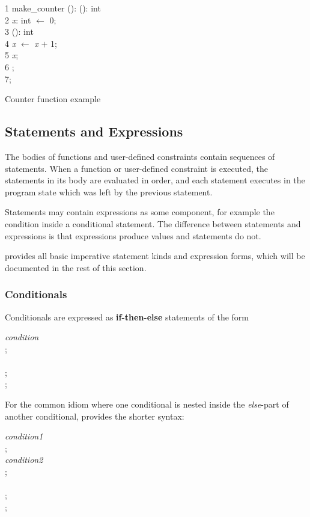 \begin{Program}
\begin{ttlprog}
1\>\ttlFun{} make\_counter (): \ttlFun{} (): int\\
2\>\>\ttlVar{} {\em x}: int $\leftarrow$ 0;\\
3\>\>\ttlReturn{} \ttlFun{} (): int\\
4\>\>\>\>\>\> {\em x} $\leftarrow$ {\em x} $+$ 1;\\
5\>\>\>\>\>\> \ttlReturn{} {\em x};\\
6\>\>\>\>\> \ttlEnd{};\\
7\>\ttlEnd{};
\end{ttlprog}
\caption{Counter function example}
\label{prog:counter}
\end{Program}

\subsection{Statements and Expressions}

The bodies of functions and user-defined constraints contain sequences
of statements.  When a function or user-defined constraint is
executed, the statements in its body are evaluated in order, and each
statement executes in the program state which was left by the previous
statement.

Statements may contain expressions as some component, for example the
condition inside a conditional statement.  The difference between
statements and expressions is that expressions produce values and
statements do not.

\turtle{} provides all basic imperative statement kinds
and expression forms, which will be documented in the rest of this
section.

\subsubsection{Conditionals}

Conditionals are expressed as {\bf if-then-else} statements of the
form
%
\begin{ttlprog}
\>\ttlIf{} {\em condition} \ttlThen{}\\
\>;\\
\>\ttlElse{}\\
\>;\\
\>\ttlEnd{};
\end{ttlprog}
%
For the common idiom where one conditional is nested inside the {\em
  else}-part of another conditional, \turtle{} provides the shorter
syntax:
%
\begin{ttlprog}
\>\ttlIf{} {\em condition1} \ttlThen{}\\
\>;\\
\>\ttlElsif{} {\em condition2} \ttlThen{}\\
\>;\\
\>\ttlElse{}\\
\>;\\
\>\ttlEnd{};
\end{ttlprog}

